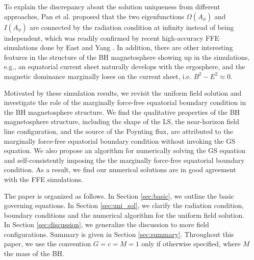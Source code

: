 \documentclass[aps,prd,reprint,nofootinbib, superscriptaddress]{revtex4-1}
\def\Ap{A_\phi}
\begin{document}
To explain the discrepancy about the solution uniqueness from different approaches, Pan et al.  \cite{Pan2017}
proposed that the two eigenfunctions $\Omega(\Ap)$ and $I(\Ap)$ are connected by the radiation condition at infinity instead of
being independent, which was readily confirmed by recent high-accuracy FFE simulations done
by East and Yang \cite{East2018}. In addition, there are other interesting features in the structure of the BH
magnetosphere showing up in the simulations, e.g., an equatorial current sheet naturally develops
with the ergosphere, and the magnetic dominance marginally loses on the current sheet, i.e. $B^2-E^2\approx 0$.

Motivated by these simulation results, we revisit the uniform field solution and investigate the role of the
marginally force-free equatorial boundary condition in the BH magnetosphere structure.
We find the qualitative properties of the BH magnetosphere structure, including the shape of the LS,
the near-horizon field line configuration, and the source of the Poynting flux, are attributed to the marginally
force-free equatorial boundary condition without invoking the GS equation.
We also  propose an algorithm for numerically solving the GS equation and
self-consistently imposing the the marginally force-free equatorial boundary condition.
As a result, we find our numerical solutions are in good agreement with the FFE simulations.


The paper is organized as follows.  In Section \ref{sec:basic}, we outline the basic governing equations.
In Section \ref{sec:uni_sol}, we clarify the radiation condition, boundary conditions and the numerical algorithm
for the uniform field solution. In Section \ref{sec:discussion}, we generalize the discussion
to  more field configurations. Summary is given in Section \ref{sec:summary}.
Throughout this paper, we use the convention $G=c=M=1$ only if otherwise specified,
where $M$ the mass of the BH.
\end{document}
